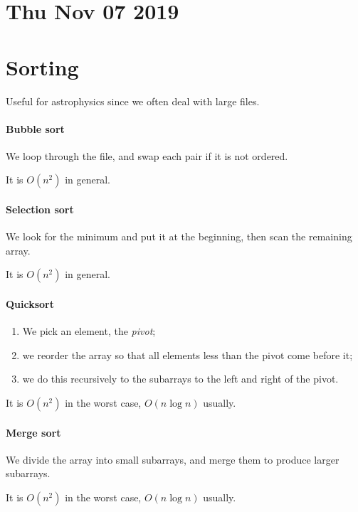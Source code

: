 \documentclass[main.tex]{subfiles}
\begin{document}
\section*{Thu Nov 07 2019}

\section{Sorting}

Useful for astrophysics since we often deal with large files.

\paragraph{Bubble sort}
We loop through the file, and swap each pair if it is not ordered.

It is \(O(n^2)\) in general.

\paragraph{Selection sort}
We look for the minimum and put it at the beginning, then scan the remaining array.

It is \(O(n^2)\) in general.

\paragraph{Quicksort}

\begin{enumerate}
    \item We pick an element, the \emph{pivot};
    \item we reorder the array so that all elements less than the pivot come before it;
    \item we do this recursively to the subarrays to the left and right of the pivot.
\end{enumerate}

It is \(O(n^2)\) in the worst case, \(O(n \log n )\) usually.

\paragraph{Merge sort}

We divide the array into small subarrays, and merge them to produce larger subarrays.

It is \(O(n^2)\) in the worst case, \(O(n \log n )\) usually.
\end{document}
